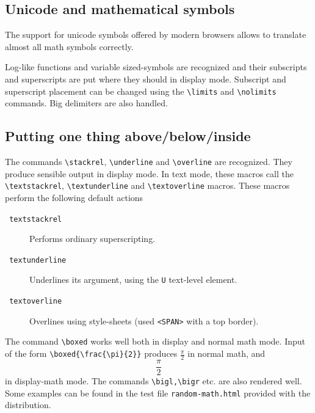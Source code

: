 \subsection{Unicode and mathematical symbols}

The support for unicode symbols offered by modern browsers allows to
translate almost all math symbols correctly.

Log-like functions and variable sized-symbols are recognized and their
subscripts and superscripts are put where they should in display mode.
Subscript and superscript placement can be changed using the
\verb+\limits+ and \verb+\nolimits+ commands.
Big delimiters are also handled.

\subsection{Putting one thing above/below/inside}

The commands \verb+\stackrel+,  \verb+\underline+ and \verb+\overline+
are recognized.
They produce sensible output in display mode.
In text mode, these macros call the \verb+\textstackrel+,
\verb+\textunderline+ and \verb+\textoverline+ macros.
These macros perform the following default actions
\begin{description}
\item[\texttt{ textstackrel}] Performs ordinary superscripting.
\item[\texttt{ textunderline}] Underlines its argument, using the
\verb+U+ text-level element.
\item[\texttt{ textoverline}] Overlines using style-sheets (used {\tt <SPAN>} with a top border). 
\end{description}

\index{\verb+\boxed+} The command \verb+\boxed+ works well both in display and normal math mode. Input of the form \verb+\boxed{\frac{\pi}{2}}+ produces $\boxed{\frac{\pi}{2}}$ in normal math, and 
$$\boxed{\frac{\pi}{2}}$$
in display-math mode. The commands \verb+\bigl,\bigr+ etc. are also rendered well. Some examples can be found \ifhevea {}\else in the test file {\tt random-math.html} provided with the distribution\fi.

